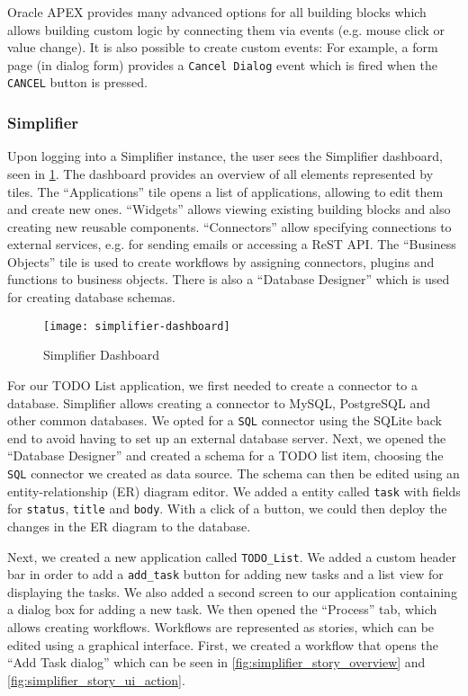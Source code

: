 \documentclass[runningheads]{llncs}
\begin{document}
Oracle APEX provides many advanced options for all building blocks which allows building custom logic by connecting them via events (e.g. mouse click or value change). It is also possible to create custom events: For example, a form page (in dialog form) provides a \texttt{Cancel Dialog} event which is fired when the \texttt{CANCEL} button is pressed.

\subsubsection{Simplifier}

Upon logging into a Simplifier instance, the user sees the Simplifier dashboard, seen in \cref{fig:simplifier_dashboard}. The dashboard provides an overview of all elements represented by tiles. The “Applications” tile opens a list of applications, allowing to edit them and create new ones. “Widgets” allows viewing existing building blocks and also creating new reusable components. “Connectors” allow specifying connections to external services, e.g. for sending emails or accessing a ReST API. The “Business Objects” tile is used to create workflows by assigning connectors, plugins and functions to business objects. There is also a “Database Designer” which is used for creating database schemas.

\begin{figure}
  \centering
  \texttt{[image: simplifier-dashboard]}
  \caption{Simplifier Dashboard}
  \label{fig:simplifier_dashboard}
\end{figure}

For our TODO List application, we first needed to create a connector to a database. Simplifier allows creating a connector to MySQL, PostgreSQL and other common databases. We opted for a \texttt{SQL} connector using the SQLite back end to avoid having to set up an external database server. Next, we opened the “Database Designer” and created a schema for a TODO list item, choosing the \texttt{SQL} connector we created as data source. The schema can then be edited using an entity-relationship (ER) diagram editor. We added a entity called \texttt{task} with fields for \texttt{status}, \texttt{title} and \texttt{body}. With a click of a button, we could then deploy the changes in the ER diagram to the database.

Next, we created a new application called \texttt{TODO\_List}. We added a custom header bar in order to add a \texttt{add\_task} button for adding new tasks and a list view for displaying the tasks. We also added a second screen to our application containing a dialog box for adding a new task. We then opened the “Process” tab, which allows creating workflows. Workflows are represented as stories, which can be edited using a graphical interface. First, we created a workflow that opens the “Add Task dialog” which can be seen in \cref{fig:simplifier_story_overview} and \cref{fig:simplifier_story_ui_action}.
\end{document}
